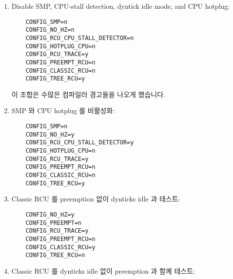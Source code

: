 \begin{enumerate}
\item	Disable SMP, CPU-stall detection, dyntick idle mode, and CPU hotplug:
\fi

\vspace{5pt}
\begin{minipage}[t]{\columnwidth}
\scriptsize
\begin{verbatim}
	CONFIG_SMP=n
	CONFIG_NO_HZ=n
	CONFIG_RCU_CPU_STALL_DETECTOR=n
	CONFIG_HOTPLUG_CPU=n
	CONFIG_RCU_TRACE=y
	CONFIG_PREEMPT_RCU=n
	CONFIG_CLASSIC_RCU=n
	CONFIG_TREE_RCU=y
\end{verbatim}
\end{minipage}
\vspace{5pt}

	이 조합은 수많은 컴파일러 경고들을 나오게 했습니다.

\item	SMP 와 CPU hotplug 를 비활성화:
\iffalse

	This combination located a number of compiler warnings.

\item	Disable SMP and CPU hotplug:
\fi

\vspace{5pt}
\begin{minipage}[t]{\columnwidth}
\scriptsize
\begin{verbatim}
	CONFIG_SMP=n
	CONFIG_NO_HZ=y
	CONFIG_RCU_CPU_STALL_DETECTOR=y
	CONFIG_HOTPLUG_CPU=n
	CONFIG_RCU_TRACE=y
	CONFIG_PREEMPT_RCU=n
	CONFIG_CLASSIC_RCU=n
	CONFIG_TREE_RCU=y
\end{verbatim}
\end{minipage}
\vspace{5pt}

\item	Classic RCU 를 preemption 없이 dynticks idle 과 테스트:
\iffalse

\item	Test Classic RCU with dynticks idle but without preemption:
\fi

\vspace{5pt}
\begin{minipage}[t]{\columnwidth}
\scriptsize
\begin{verbatim}
	CONFIG_NO_HZ=y
	CONFIG_PREEMPT=n
	CONFIG_RCU_TRACE=y
	CONFIG_PREEMPT_RCU=n
	CONFIG_CLASSIC_RCU=y
	CONFIG_TREE_RCU=n
\end{verbatim}
\end{minipage}
\vspace{5pt}

\item	Classic RCU 를 dynticks idle 없이 preemption 과 함께 테스트:
\iffalse


\end{enumerate}
